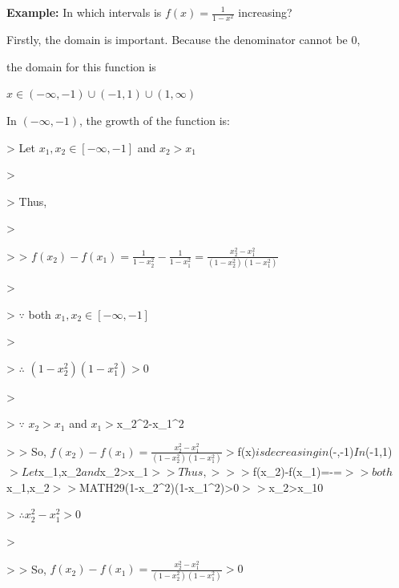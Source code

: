 \textbf{Example:} In which intervals is $f(x)=\frac{1}{1-x^2}$ increasing?



Firstly, the domain is important. Because the denominator cannot be 0,

the domain for this function is



$x\in(-\infty,-1)\cup(-1,1)\cup(1,\infty)$



In $(-\infty,-1)$, the growth of the function is:



> Let $x_1,x_2\in[-\infty,-1]$ and $x_2>x_1$

>

> Thus,

>

> > $f(x_2)-f(x_1)=\frac{1}{1-x_2^2}-\frac{1}{1-x_1^2}=\frac{x_2^2-x_1^2}{(1-x_2^2)(1-x_1^2)}$

>

> $\because$ both $x_1,x_2\in[-\infty,-1]$

>

> $\therefore$ $(1-x_2^2)(1-x_1^2)>0$

>

> $\because$ $x_2>x_1$ and $x_1

> $\therefore$ $x_2^2-x_1^2

> > So, $f(x_2)-f(x_1)=\frac{x_2^2-x_1^2}{(1-x_2^2)(1-x_1^2)}

> $f(x)$ is decreasing in $(-\infty,-1)$



In $(-1,1)$



> Let $x_1,x_2\in[-1,1]$ and $x_2>x_1$

>

> Thus,

>

> > $f(x_2)-f(x_1)=-=$

>

> $\because$ both $x_1,x_2\in[-\infty,-1]$

>

> $\therefore MATH29 (1-x_2^2)(1-x_1^2)>0$

>

> $\because x_2>x_10

> $\therefore x_2^2-x_1^2>0$

>

> > So, $f(x_2)-f(x_1)=\frac{x_2^2-x_1^2}{(1-x_2^2)(1-x_1^2)}>0$

